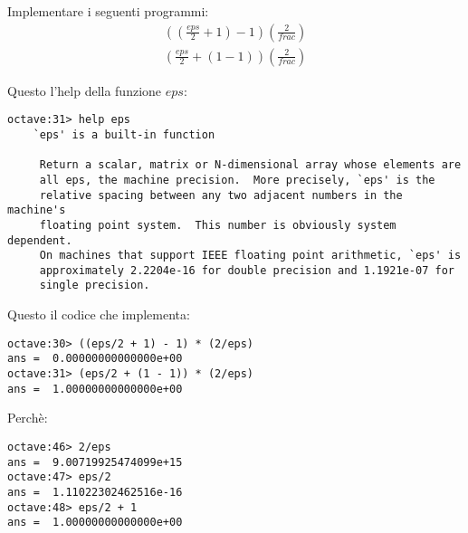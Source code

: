\begin{exercise}[1.13]
Implementare i seguenti programmi:
\begin{displaymath}
\begin{split}
	\left ( \left ( \frac{eps}{2} + 1 \right ) - 1 \right ) \left ( \frac{2}{frac} \right ) \\
	\left ( \frac{eps}{2}  + \left ( 1 - 1 \right ) \right ) \left ( \frac{2}{frac} \right )
\end{split}
\end{displaymath}
\end{exercise}
Questo l'help della funzione $eps$:
\begin{lstlisting}
octave:31> help eps
	`eps' is a built-in function

     Return a scalar, matrix or N-dimensional array whose elements are
     all eps, the machine precision.  More precisely, `eps' is the
     relative spacing between any two adjacent numbers in the machine's
     floating point system.  This number is obviously system dependent.
     On machines that support IEEE floating point arithmetic, `eps' is
     approximately 2.2204e-16 for double precision and 1.1921e-07 for
     single precision.
\end{lstlisting}
Questo il codice che implementa:
\begin{lstlisting}
octave:30> ((eps/2 + 1) - 1) * (2/eps)
ans =  0.00000000000000e+00
octave:31> (eps/2 + (1 - 1)) * (2/eps)
ans =  1.00000000000000e+00
\end{lstlisting}
Perch\`e:
\begin{lstlisting}
octave:46> 2/eps
ans =  9.00719925474099e+15
octave:47> eps/2
ans =  1.11022302462516e-16
octave:48> eps/2 + 1
ans =  1.00000000000000e+00
\end{lstlisting}

